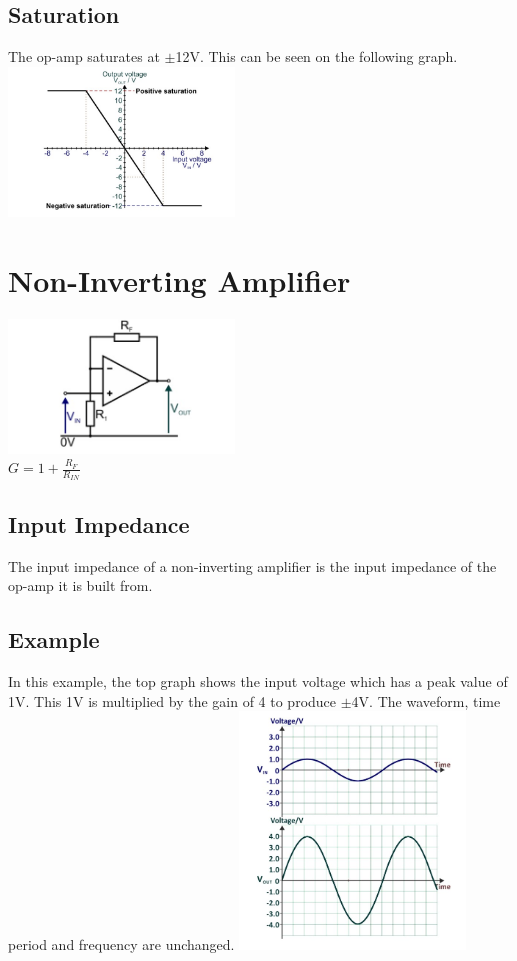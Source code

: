 \documentclass[a4paper,11pt, twocolumn]{article}
\begin{document}
\subsection{Saturation}
The op-amp saturates at $\pm$12V. This can be seen on the following graph.
\includegraphics[width=0.45\textwidth]{invAmp-2.jpg}

\section{Non-Inverting Amplifier}
\includegraphics[width=0.45\textwidth]{nonAmp.jpg}\\
$\displaystyle G = 1+ \frac{R_F}{R_{IN}}$
\subsection{Input Impedance}
The input impedance of a non-inverting amplifier is the input impedance of the op-amp it is built from. 
\subsection{Example}
In this example, the top graph shows the input voltage which has a peak value of 1V. This 1V is multiplied by the gain of 4 to produce $\pm$4V. The waveform, time period and frequency are unchanged.
\includegraphics[width=0.45\textwidth]{nonAmp-1.jpg}
\end{document}
